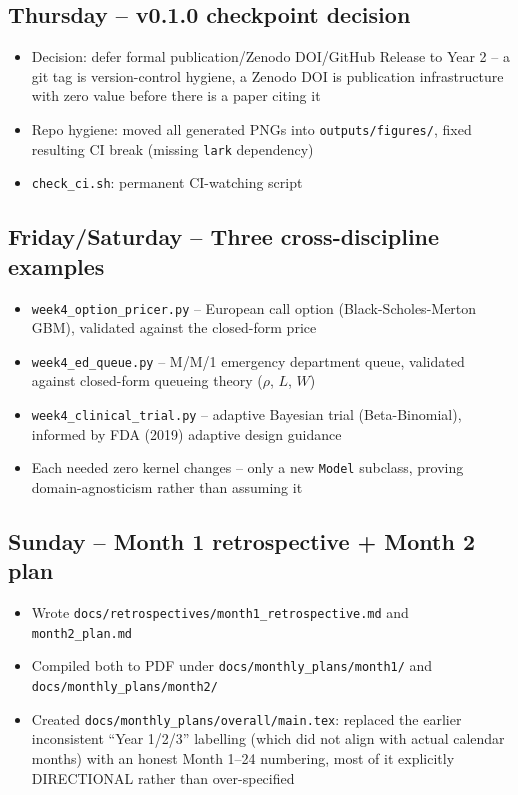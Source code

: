\documentclass[11pt]{article}
\begin{document}
\subsection*{Thursday -- v0.1.0 checkpoint decision}
\begin{itemize}[leftmargin=*]
  \item Decision: defer formal publication/Zenodo DOI/GitHub Release
    to Year 2 -- a git tag is version-control hygiene, a Zenodo DOI is
    publication infrastructure with zero value before there is a paper
    citing it
  \item Repo hygiene: moved all generated PNGs into
    \texttt{outputs/figures/}, fixed resulting CI break (missing
    \texttt{lark} dependency)
  \item \texttt{check\_ci.sh}: permanent CI-watching script
\end{itemize}

\subsection*{Friday/Saturday -- Three cross-discipline examples}
\begin{itemize}[leftmargin=*]
  \item \texttt{week4\_option\_pricer.py} -- European call option
    (Black-Scholes-Merton GBM), validated against the closed-form price
  \item \texttt{week4\_ed\_queue.py} -- M/M/1 emergency department
    queue, validated against closed-form queueing theory ($\rho$, $L$,
    $W$)
  \item \texttt{week4\_clinical\_trial.py} -- adaptive Bayesian trial
    (Beta-Binomial), informed by FDA (2019) adaptive design guidance
  \item Each needed zero kernel changes -- only a new \texttt{Model}
    subclass, proving domain-agnosticism rather than assuming it
\end{itemize}

\subsection*{Sunday -- Month 1 retrospective + Month 2 plan}
\begin{itemize}[leftmargin=*]
  \item Wrote \texttt{docs/retrospectives/month1\_retrospective.md} and
    \texttt{month2\_plan.md}
  \item Compiled both to PDF under
    \texttt{docs/monthly\_plans/month1/} and
    \texttt{docs/monthly\_plans/month2/}
  \item Created \texttt{docs/monthly\_plans/overall/main.tex}: replaced
    the earlier inconsistent ``Year 1/2/3'' labelling (which did not
    align with actual calendar months) with an honest Month 1--24
    numbering, most of it explicitly DIRECTIONAL rather than
    over-specified
\end{itemize}
\end{document}
